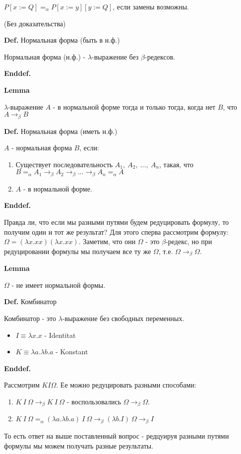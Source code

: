 \documentclass[12pt]{extreport}
\begin{document}
$P[x := Q] =_\alpha P[x := y][y := Q]$, если замены возможны.

(Без доказательства)

\noindent\textbf{Def.} Нормальная форма (быть в н.ф.)

    Нормальная форма (н.ф.) - $\lambda$-выражение без $\beta$-редексов.
    
\noindent\textbf{Enddef.}

\noindent\textbf{Lemma} 

    $\lambda$-выражение $A$ - в нормальной форме тогда и только тогда, когда нет $B$, что $A\rightarrow_\beta B$
    
\noindent\textbf{Def.} Нормальная форма (иметь н.ф.)

    $A$ - нормальная форма $B$, если:
    \begin{enumerate}[leftmargin=2cm]
        \item Существует последовательность $A_1,\ A_2,\ \dots,\ A_n$, такая, что $B =_\alpha A_1 \rightarrow_\beta A_2 \rightarrow_\beta \dots \rightarrow_\beta A_n =_\alpha A$
        \item $A$ - в нормальной форме.
    \end{enumerate}
    
\noindent\textbf{Enddef.}

Правда ли, что если мы разными путями будем редуцировать формулу, то получим один и тот же результат? Для этого сперва рассмотрим формулу: $\Omega = (\lambda x.x x)(\lambda x.x x)$. Заметим, что они $\Omega$ - это $\beta$-редекс, но при редуцировании формулы мы получаем все ту же $\Omega$, т.е. $\Omega \rightarrow_\beta \Omega$.

\noindent\textbf{Lemma} 

    $\Omega$ - не имеет нормальной формы.
    
    
\noindent\textbf{Def.} Комбинатор
    
    Комбинатор - это $\lambda$-выражение без свободных переменных.
    \begin{itemize}[leftmargin=2cm]
        \item $I \equiv \lambda x.x$ - Identitat
        \item $K \equiv \lambda a. \lambda b. a$ - Konstant
    \end{itemize}
    
\noindent\textbf{Enddef.}

Рассмотрим $K I \Omega$. Ее можно редуцировать разными способами:
\begin{enumerate}[leftmargin=2cm]
    \item $K\ I\ \Omega \rightarrow_\beta K\ I\ \Omega$ - воспользовались $\Omega \rightarrow_\beta \Omega$.
    \item $K\ I\ \Omega =_\alpha (\lambda a.\lambda b.a)\ I\ \Omega \rightarrow_\beta (\lambda b.I)\ \Omega \rightarrow_\beta I$
\end{enumerate}
То есть ответ на выше поставленный вопрос - редцуируя разными путями формулы мы можем получать разные результаты.
\end{document}
